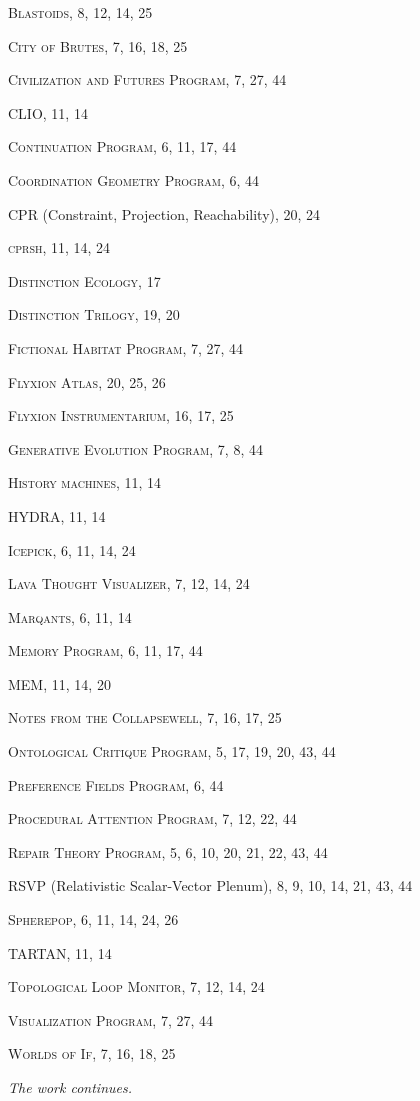 \documentclass[12pt, openany]{book}
\begin{document}
\medskip
\noindent\textsc{Blastoids}, 8, 12, 14, 25

\medskip
\noindent\textsc{City of Brutes}, 7, 16, 18, 25

\medskip
\noindent\textsc{Civilization and Futures Program}, 7, 27, 44

\medskip
\noindent\textsc{CLIO}, 11, 14

\medskip
\noindent\textsc{Continuation Program}, 6, 11, 17, 44

\medskip
\noindent\textsc{Coordination Geometry Program}, 6, 44

\medskip
\noindent\textsc{CPR} (Constraint, Projection, Reachability), 20, 24

\medskip
\noindent\textsc{cprsh}, 11, 14, 24

\medskip
\noindent\textsc{Distinction Ecology}, 17

\medskip
\noindent\textsc{Distinction Trilogy}, 19, 20

\medskip
\noindent\textsc{Fictional Habitat Program}, 7, 27, 44

\medskip
\noindent\textsc{Flyxion Atlas}, 20, 25, 26

\medskip
\noindent\textsc{Flyxion Instrumentarium}, 16, 17, 25

\medskip
\noindent\textsc{Generative Evolution Program}, 7, 8, 44

\medskip
\noindent\textsc{History machines}, 11, 14

\medskip
\noindent\textsc{HYDRA}, 11, 14

\medskip
\noindent\textsc{Icepick}, 6, 11, 14, 24

\medskip
\noindent\textsc{Lava Thought Visualizer}, 7, 12, 14, 24

\medskip
\noindent\textsc{Marqants}, 6, 11, 14

\medskip
\noindent\textsc{Memory Program}, 6, 11, 17, 44

\medskip
\noindent\textsc{MEM}, 11, 14, 20

\medskip
\noindent\textsc{Notes from the Collapsewell}, 7, 16, 17, 25

\medskip
\noindent\textsc{Ontological Critique Program}, 5, 17, 19, 20, 43, 44

\medskip
\noindent\textsc{Preference Fields Program}, 6, 44

\medskip
\noindent\textsc{Procedural Attention Program}, 7, 12, 22, 44

\medskip
\noindent\textsc{Repair Theory Program}, 5, 6, 10, 20, 21, 22, 43, 44

\medskip
\noindent\textsc{RSVP} (Relativistic Scalar-Vector Plenum), 8, 9, 10, 14, 21, 43, 44

\medskip
\noindent\textsc{Spherepop}, 6, 11, 14, 24, 26

\medskip
\noindent\textsc{TARTAN}, 11, 14

\medskip
\noindent\textsc{Topological Loop Monitor}, 7, 12, 14, 24

\medskip
\noindent\textsc{Visualization Program}, 7, 27, 44

\medskip
\noindent\textsc{Worlds of If}, 7, 16, 18, 25

\medskip
\noindent\textit{The work continues.}
\end{document}
